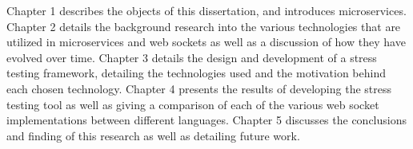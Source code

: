 Chapter 1 describes the objects of this dissertation, and introduces microservices. Chapter 2 details the background research into the various technologies that are utilized in microservices and web sockets as well as a discussion of how they have evolved over time. Chapter 3 details the design and development of a stress testing framework, detailing the technologies used and the motivation behind each chosen technology. Chapter 4 presents the results of developing the stress testing tool as well as giving a comparison of each of the various web socket implementations between different languages. Chapter 5 discusses the conclusions and finding of this research as well as detailing future work.